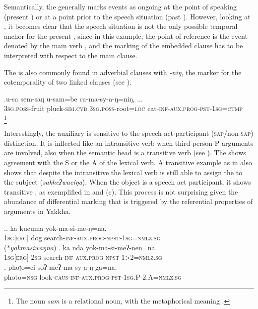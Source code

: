 Semantically, the  generally marks events as ongoing at the point of speaking (present ) or at a point prior to the speech situation (past ). However, looking at \Last[c], it becomes clear that the speech situation is not the only possible temporal anchor for the present , since in this example, the  point of reference is the event denoted by the main verb , and the  marking of the embedded clause has to be interpreted with respect to the main clause.


The  is also commonly found in adverbial clauses with \emph{-niŋ}, the marker for the cotemporality of two linked clauses (see \Next). 

\exg.u-sa   sem-saŋ        u-sam=be               ca-ma-sy-a-ŋ=niŋ, ...\\
{\scshape 3sg.poss-}fruit pluck{\scshape -sim.cvb}  {\scshape 3sg.poss-}root{\scshape =loc} eat{\scshape -inf-aux.prog-pst-1sg=ctmp}\\
\footnote{The noun \emph{sam} is a relational noun,  with the metaphorical meaning .} 

Interestingly, the  auxiliary is sensitive to the speech-act-participant (\textsc{sap}/non-\textsc{sap}) distinction. It is inflected like an intransitive verb when  third person P arguments are involved, also when the semantic head is a transitive verb (see \Next[a]). The  shows  agreement with the S or the A of the lexical verb. A transitive example as in \LLast[c] also shows that despite the intransitive   the lexical verb is still able to assign the   to the subject (\emph{sakheʔwaciŋa}).  When the object is a speech act participant, it shows transitive , as exemplified in \Next[b] and (c). This process is not surprising given the abundance of differential marking that is triggered by the referential properties of arguments in Yakkha.

\ex.\ag. ka kucuma yok-ma-si-me-ŋ=na.\\
	{\scshape 1sg[erg]} dog search-{\scshape inf-aux.prog-npst-1sg=nmlz.sg}\\
	  (*\emph{yokmasiwaŋna})
\bg. ka nda yok-ma-si-meʔ-nen=na.\\
{\scshape 1sg[erg]} {\scshape 2sg} search-{\scshape inf-aux.prog-npst-1>2=nmlz.sg}\\
\bg. phoʈo=ci soʔ-meʔ-ma-sy-a-ŋ-ga=na.\\
photo{\scshape =nsg} look{\scshape -caus-inf-aux.prog-pst-1sg.P-2.A=nmlz.sg}\\

